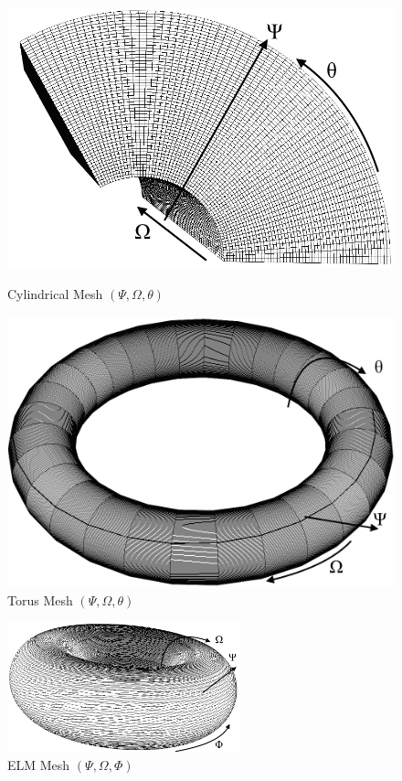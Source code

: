 \documentclass[12pt,a4paper]{article}
\begin{document}
\begin{figure}[H]
	\centering
	\begin{minipage}[H]{0.4\textwidth}
		\includegraphics[width=\textwidth]{"./images/cylindrical mesh annotated"}
		\caption{Cylindrical Mesh $(\Psi , \Omega , \theta )$}
		\label{fig:cylindricalmesh}
	\end{minipage}%
	\hfill
	\begin{minipage}[H]{0.4\textwidth}
		\includegraphics[width=\textwidth]{"./images/torus mesh annotated"}
		\caption{Torus Mesh $(\Psi, \Omega, \theta)$}
		\label{fig:torusmesh}
	\end{minipage}
\end{figure}

\begin{figure}[H]
	\centering
	\includegraphics[width=0.6\textwidth]{"./images/elm mesh annotated"}
	\caption{ELM Mesh $(\Psi,\Omega, \Phi)$}
	\label{fig:elmmesh}
\end{figure}
\end{document}
